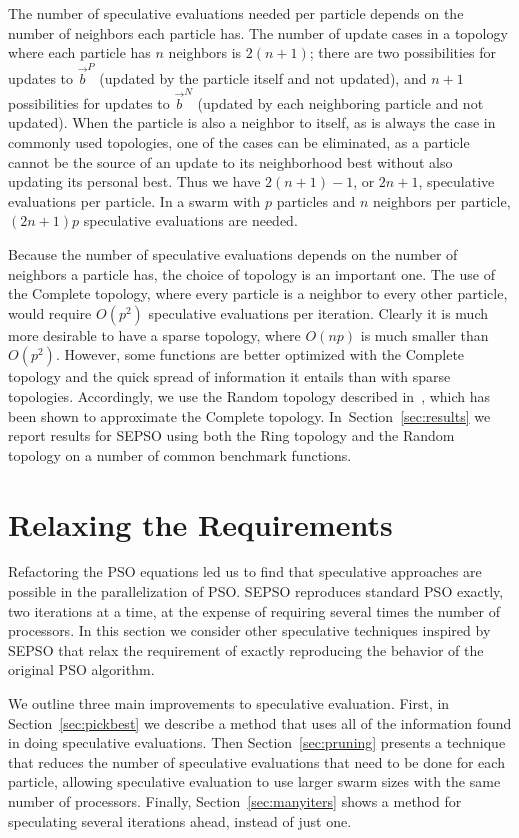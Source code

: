 \documentclass[smallcondensed]{svjour3}
\renewcommand{\sec}[1]{Section~\ref{sec:#1}}
\providecommand{\pers}{\ensuremath{P}}
\providecommand{\neigh}{\ensuremath{N}}
\providecommand{\nbest}{\ensuremath{\Vec{b}^\neigh}}
\providecommand{\pbest}{\ensuremath{\Vec{b}^\pers}}
\begin{document}
The number of speculative evaluations needed per particle depends on the number
of neighbors each particle has.  The number of update cases in a topology where
each particle has $n$ neighbors is $2(n+1)$; there are two possibilities for
updates to $\pbest$ (updated by the particle itself and not updated), and $n+1$
possibilities for updates to $\nbest$ (updated by each neighboring particle and
not updated).  When the particle is also a neighbor to itself, as is always the
case in commonly used topologies, one of the cases can be eliminated, as a
particle cannot be the source of an update to its neighborhood best without
also updating its personal best.  Thus we have $2(n+1)-1$, or $2n+1$,
speculative evaluations per particle.  In a swarm with $p$ particles and $n$
neighbors per particle, $(2n+1)p$ speculative evaluations are needed.

Because the number of speculative evaluations depends on the number of
neighbors a particle has, the choice of topology is an important one.  The use
of the Complete topology, where every particle is a neighbor to every other
particle, would require $O(p^2)$ speculative evaluations per iteration.
Clearly it is much more desirable to have a sparse topology, where $O(np)$ is
much smaller than $O(p^2)$.  However, some functions are better optimized with
the Complete topology and the quick spread of information it entails than with
sparse topologies.  Accordingly, we use the Random topology described
in~\citep{mcnabb-2009-large-particle-swarms}, which has been shown to
approximate the Complete topology.  In~\sec{results} we report results for
SEPSO using both the Ring topology and the Random topology on a number of
common benchmark functions.

\section{Relaxing the Requirements}
\label{sec:relax}

Refactoring the PSO equations led us to find that speculative approaches are
possible in the parallelization of PSO.  SEPSO reproduces standard PSO exactly,
two iterations at a time, at the expense of requiring several times the number
of processors.  In this section we consider other speculative techniques
inspired by SEPSO that relax the requirement of exactly reproducing the
behavior of the original PSO algorithm.

We outline three main improvements to speculative evaluation.  First, in
\sec{pickbest} we describe a method that uses all of the information found in
doing speculative evaluations.  Then Section~\ref{sec:pruning} presents a
technique that reduces the number of speculative evaluations that need to be
done for each particle, allowing speculative evaluation to use larger swarm
sizes with the same number of processors.  Finally, \sec{manyiters} shows a
method for speculating several iterations ahead, instead of just one.
\end{document}
